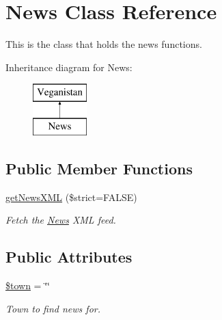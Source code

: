 \hypertarget{class_news}{}\section{News Class Reference}
\label{class_news}


This is the class that holds the news functions.  


Inheritance diagram for News\+:\begin{figure}[H]
\begin{center}
\leavevmode
\includegraphics[height=2.000000cm]{class_news}
\end{center}
\end{figure}
\subsection*{Public Member Functions}
\begin{DoxyCompactItemize}
\item 
\hyperlink{class_news_ae09b063136b3d937ff18a3fbf59a1110}{get\+News\+X\+ML} (\$strict=F\+A\+L\+SE)
\begin{DoxyCompactList}\small\item\em Fetch the \hyperlink{class_news}{News} X\+ML feed. \end{DoxyCompactList}\end{DoxyCompactItemize}
\subsection*{Public Attributes}
\begin{DoxyCompactItemize}
\item 
\hyperlink{class_news_a7edd0e2bb0d22b388b300fbcfb1bf424}{\$town} = \char`\"{}\char`\"{}
\begin{DoxyCompactList}\small\item\em Town to find news for. \end{DoxyCompactList}\end{DoxyCompactItemize}
